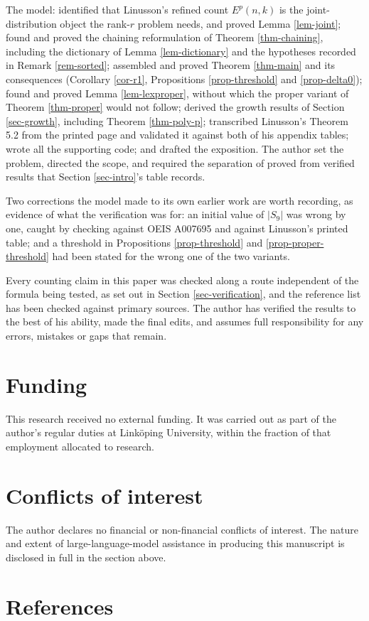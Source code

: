 \documentclass[11pt, a4paper, abstract=yes]{scrartcl}
\theoremstyle{definition}
\theoremstyle{remark}
\theoremstyle{plain}
\begin{document}
The model: identified that Linusson's refined count \(E^p(n,k)\) is the joint-distribution object the
rank-\(r\) problem needs, and proved Lemma \ref{lem-joint}; found and proved the chaining reformulation
of Theorem \ref{thm-chaining}, including the dictionary of Lemma \ref{lem-dictionary} and the hypotheses
recorded in Remark \ref{rem-sorted}; assembled and proved Theorem \ref{thm-main} and its consequences
(Corollary \ref{cor-r1}, Propositions \ref{prop-threshold} and \ref{prop-delta0}); found and proved
Lemma \ref{lem-lexproper}, without which the proper variant of Theorem \ref{thm-proper} would not follow;
derived the growth results of Section \ref{sec-growth}, including Theorem \ref{thm-poly-p}; transcribed
Linusson's Theorem 5.2 from the printed page and validated it against both of his appendix tables;
wrote all the supporting code; and drafted the exposition. The author set the problem, directed the
scope, and required the separation of proved from verified results that Section \ref{sec-intro}'s table
records.

Two corrections the model made to its own earlier work are worth recording, as evidence of what the
verification was for: an initial value of \(|S_9|\) was wrong by one, caught by checking against
OEIS A007695 and against Linusson's printed table; and a threshold in Propositions \ref{prop-threshold}
and \ref{prop-proper-threshold} had been stated for the wrong one of the two variants.

Every counting claim in this paper was checked along a route independent of the formula being tested,
as set out in Section \ref{sec-verification}, and the reference list has been checked against primary
sources. The author has verified the results to the best of his ability, made the final edits, and
assumes full responsibility for any errors, mistakes or gaps that remain.
\section*{Funding}
\label{sec:org34dea2f}
This research received no external funding. It was carried out as part of the author's regular duties
at Linköping University, within the fraction of that employment allocated to research.
\section*{Conflicts of interest}
\label{sec:org122a7d4}
The author declares no financial or non-financial conflicts of interest. The nature and extent of
large-language-model assistance in producing this manuscript is disclosed in full in the section
above.
\section*{References}
\label{sec:orgb50d301}
\printbibliography[heading=none]
\end{document}
